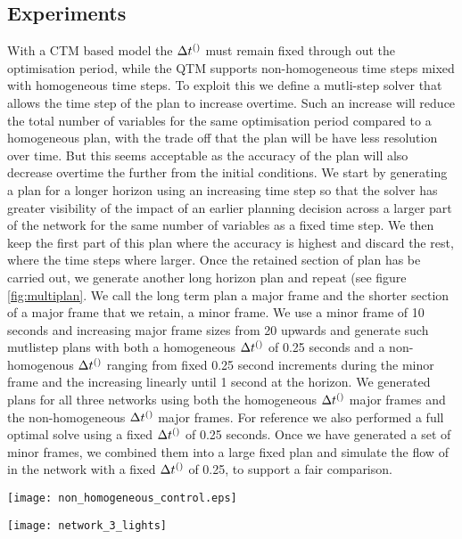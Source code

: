 \subsection{Experiments}
With a CTM based model the $\DT[]$ must remain fixed through out the optimisation period, while the QTM supports non-homogeneous time steps mixed with homogeneous time steps. To exploit this we define a mutli-step solver that allows the time step of the plan to increase overtime. Such an increase will reduce the total number of variables for the same optimisation period compared to a homogeneous plan, with the trade off that the plan will be have less resolution over time. But this seems acceptable as the accuracy of the plan will also decrease overtime the further from the initial conditions.
We start by generating a plan for a longer horizon using an increasing time step so that the solver has greater visibility of the impact of an earlier planning decision across a larger part of the network for the same number of variables as a fixed time step. We then keep the first part of this plan where the accuracy is highest and discard the rest, where the time steps where larger. Once the retained section of plan has be carried out, we generate another long horizon plan and repeat (see figure \ref{fig:multiplan}.
We call the long term plan a major frame and the shorter section of a major frame that we retain, a minor frame. We use a minor frame of 10 seconds and increasing major frame sizes from 20 upwards and generate such mutlistep plans with both a homogeneous $\DT[]$ of 0.25 seconds and a non-homogenous $\DT[]$ ranging from fixed 0.25 second increments during the minor frame and the increasing linearly until 1 second at the horizon. We generated plans for all three networks using both the homogeneous $\DT[]$ major frames and the non-homogeneous $\DT[]$ major frames. For reference we also performed a full optimal solve using a fixed $\DT[]$ of 0.25 seconds. Once we have generated a set of minor frames, we combined them into a large fixed plan and simulate the flow of in the network with a fixed $\DT[]$ of 0.25, to support a fair comparison.

\begin{figure*}[t!]
\centering
\texttt{[image: non\_homogeneous\_control.eps]}
\caption{Multi-step planning}
\label{fig:multiplan}
\end{figure*}


\begin{figure*}[t!]
\centering
\texttt{[image: network\_3\_lights]}
\caption{Network 1}
\label{fig:network3}
\end{figure*}

